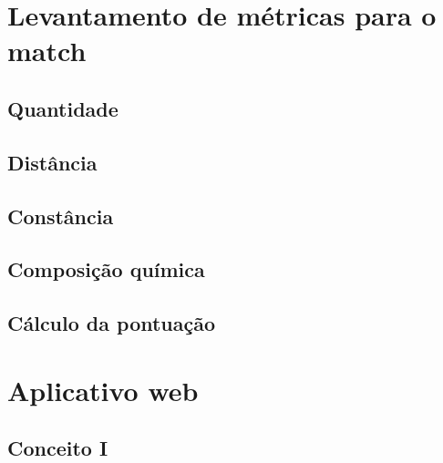 \section{Levantamento de métricas para o match}

\subsection{Quantidade}

\subsection{Distância}

\subsection{Constância}

\subsection{Composição química}

\subsection{Cálculo da pontuação}

\section{Aplicativo web}

\subsection{Conceito I}

